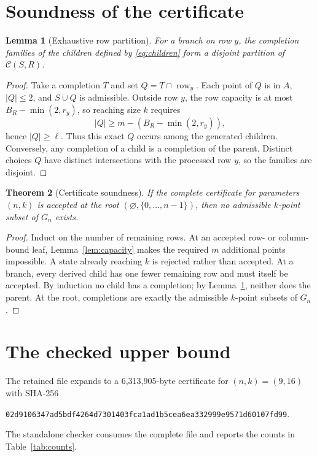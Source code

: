 \documentclass[11pt,a4paper]{article}
\newtheorem{theorem}{Theorem}[section]
\newtheorem{lemma}[theorem]{Lemma}
\theoremstyle{definition}
\theoremstyle{remark}
\newcommand{\C}{\mathcal C}
\newcommand{\row}{\operatorname{row}}
\begin{document}
\section{Soundness of the certificate}\label{sec:soundness}
\begin{lemma}[Exhaustive row partition]\label{lem:partition}
For a branch on row $y$, the completion families of the children defined by
\eqref{eq:children} form a disjoint partition of $\C(S,R)$.
\end{lemma}
\begin{proof}
Take a completion $T$ and set $Q=T\cap\row_y$. Each point of $Q$ is in $A$,
$|Q|\le2$, and $S\cup Q$ is admissible. Outside row $y$, the row capacity is
at most $B_R-\min(2,r_y)$, so reaching size $k$ requires
\[
  |Q|\ge m-(B_R-\min(2,r_y)),
\]
hence $|Q|\ge\ell$. Thus this exact $Q$ occurs among the generated children.
Conversely, any completion of a child is a completion of the parent. Distinct
choices $Q$ have distinct intersections with the processed row $y$, so the
families are disjoint.
\end{proof}

\begin{theorem}[Certificate soundness]\label{thm:sound}
If the complete certificate for parameters $(n,k)$ is accepted at the root
$(\varnothing,\{0,\ldots,n-1\})$, then no admissible $k$-point subset of
$G_n$ exists.
\end{theorem}
\begin{proof}
Induct on the number of remaining rows. At an accepted row- or column-bound
leaf, Lemma~\ref{lem:capacity} makes the required $m$ additional points
impossible. A state already reaching $k$ is rejected rather than accepted.
At a branch, every derived child has one fewer remaining row and must itself
be accepted. By induction no child has a completion; by
Lemma~\ref{lem:partition}, neither does the parent. At the root, completions
are exactly the admissible $k$-point subsets of $G_n$.
\end{proof}

\section{The checked upper bound}\label{sec:upper}
The retained file  expands to a
6,313,905-byte certificate for $(n,k)=(9,16)$ with SHA-256
\begin{center}
\small\texttt{02d9106347ad5bdf4264d7301403fca1ad1b5cea6ea332999e9571d60107fd99}.
\end{center}
The standalone checker consumes the complete file and reports the counts in
Table~\ref{tab:counts}.
\end{document}
